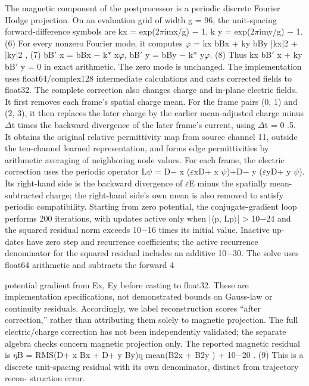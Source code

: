 \documentclass[11pt]{article}
\begin{document}
The magnetic component of the postprocessor is a periodic discrete Fourier Hodge projection. On
an evaluation grid of width g = 96, the unit-spacing forward-difference symbols are
kx = exp(2\ensuremath{\pi}imx/g) \ensuremath{-} 1, k y = exp(2\ensuremath{\pi}imy/g) \ensuremath{-} 1. (6)
For every nonzero Fourier mode, it computes
\ensuremath{\varphi} = kx bBx + ky bBy
|kx|2 + |ky|2 , (7)
bB\ensuremath{\prime}
x = bBx \ensuremath{-} k\ensuremath{\ast}
x\ensuremath{\varphi}, bB\ensuremath{\prime}
y = bBy \ensuremath{-} k\ensuremath{\ast}
y\ensuremath{\varphi}. (8)
Thus kx bB\ensuremath{\prime}
x + ky bB\ensuremath{\prime}
y = 0 in exact arithmetic. The zero mode is unchanged. The implementation uses
float64/complex128 intermediate calculations and casts corrected fields to float32.
The complete correction also changes charge and in-plane electric fields. It first removes each
frame’s spatial charge mean. For the frame pairs (0, 1) and (2, 3), it then replaces the later charge
by the earlier mean-adjusted charge minus \ensuremath{\Delta}t times the backward divergence of the later frame’s
current, using \ensuremath{\Delta}t = 0 .5. It obtains the original relative permittivity map from source channel
11, outside the ten-channel learned representation, and forms edge permittivities by arithmetic
averaging of neighboring node values.
For each frame, the electric correction uses the periodic operator L\ensuremath{\psi} = D\ensuremath{-}
x (\ensuremath{\varepsilon}xD+
x \ensuremath{\psi})+D\ensuremath{-}
y (\ensuremath{\varepsilon}yD+
y \ensuremath{\psi}).
Its right-hand side is the backward divergence of \ensuremath{\varepsilon}E minus the spatially mean-subtracted charge;
the right-hand side’s own mean is also removed to satisfy periodic compatibility. Starting from
zero potential, the conjugate-gradient loop performs 200 iterations, with updates active only when
|\ensuremath{\langle}p, Lp\ensuremath{\rangle}| > 10\ensuremath{-}24 and the squared residual norm exceeds 10\ensuremath{-}16 times its initial value. Inactive up-
dates have zero step and recurrence coefficients; the active recurrence denominator for the squared
residual includes an additive 10\ensuremath{-}30. The solve uses float64 arithmetic and subtracts the forward
4

potential gradient from Ex, Ey before casting to float32. These are implementation specifications,
not demonstrated bounds on Gauss-law or continuity residuals.
Accordingly, we label reconstruction scores “after correction,” rather than attributing them solely
to magnetic projection. The full electric/charge correction has not been independently validated;
the separate algebra checks concern magnetic projection only. The reported magnetic residual is
\ensuremath{\eta}B = RMS(D+
x Bx + D+
y By)q
mean(B2x + B2y ) + 10\ensuremath{-}20
. (9)
This is a discrete unit-spacing residual with its own denominator, distinct from trajectory recon-
struction error.
\end{document}
